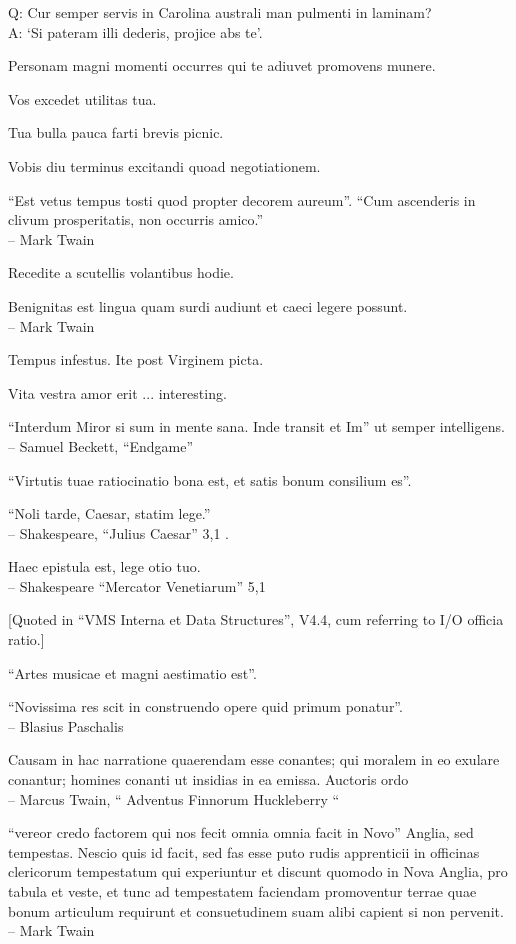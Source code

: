 \documentclass[titlepage,12pt]{memoir}
\begin{document}
Q: Cur semper servis in Carolina australi man
pulmenti in laminam?\\
A: ‘Si pateram illi dederis, projice abs te’.

Personam magni momenti occurres qui te adiuvet promovens munere.

Vos excedet utilitas tua.

Tua bulla pauca farti brevis picnic.

Vobis diu terminus excitandi quoad negotiationem.

“Est vetus tempus tosti quod propter decorem aureum”.
“Cum ascenderis in clivum prosperitatis, non occurris amico.”
\\-- Mark Twain

Recedite a scutellis volantibus hodie.

 Benignitas est lingua quam surdi audiunt et caeci legere possunt.
\\-- Mark Twain

Tempus infestus. Ite post Virginem picta.

Vita vestra amor erit ... interesting.

“Interdum Miror si sum in mente sana. Inde transit et Im”
ut semper intelligens.
\\-- Samuel Beckett, “Endgame”

“Virtutis tuae ratiocinatio bona est, et satis bonum consilium es”.

“Noli tarde, Caesar, statim lege.”
\\-- Shakespeare, “Julius Caesar” 3,1 .

Haec epistula est, lege otio tuo.
\\-- Shakespeare “Mercator Venetiarum” 5,1

[Quoted in “VMS Interna et Data Structures”, V4.4, cum
referring to I/O officia ratio.]

“Artes musicae et magni aestimatio est”.

“Novissima res scit in construendo opere quid primum ponatur”.
\\-- Blasius Paschalis

 Causam in hac narratione quaerendam esse conantes;
qui moralem in eo exulare conantur; homines conanti
ut insidias in ea emissa. Auctoris ordo
\\-- Marcus Twain, “ Adventus Finnorum Huckleberry “

“vereor credo factorem qui nos fecit omnia omnia facit in Novo”
Anglia, sed tempestas. Nescio quis id facit, sed fas esse puto
rudis apprenticii in officinas clericorum tempestatum qui experiuntur et discunt quomodo in
Nova Anglia, pro tabula et veste, et tunc ad tempestatem faciendam promoventur
terrae quae bonum articulum requirunt et consuetudinem suam alibi capient
si non pervenit.
\\-- Mark Twain
\end{document}
